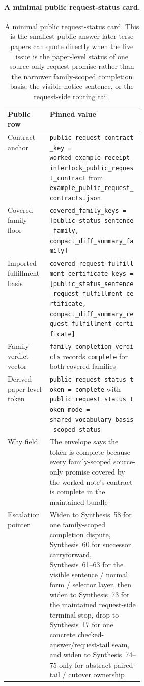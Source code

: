 \documentclass[11pt]{article}
\begin{document}
\paragraph{A minimal public request-status card.}
\begin{table}[t]
\centering
\small
\begin{tabularx}{0.97\linewidth}{@{}p{0.31\linewidth}X@{}}
\toprule
\textbf{Public row} & \textbf{Pinned value}\\
\midrule
Contract anchor & \texttt{public\_request\_contract\_key = worked\_example\_receipt\_interlock\_public\_request\_contract} from \nolinkurl{example_public_request_contracts.json} \\
Covered family floor & \texttt{covered\_family\_keys = [public\_status\_sentence\_family, compact\_diff\_summary\_family]} \\
Imported fulfillment basis & \texttt{covered\_request\_fulfillment\_certificate\_keys = [public\_status\_sentence\_request\_fulfillment\_certificate, compact\_diff\_summary\_request\_fulfillment\_certificate]} \\
Family verdict vector & \texttt{family\_completion\_verdicts} records \texttt{complete} for both covered families \\
Derived paper-level token & \texttt{public\_request\_status\_token = complete} with \texttt{public\_request\_status\_token\_mode = shared\_vocabulary\_basis\_scoped\_status} \\
Why field & The envelope says the token is complete because every family-scoped source-only promise covered by the worked note's contract is complete in the maintained bundle \\
Escalation pointer & Widen to Synthesis~58 for one family-scoped completion dispute, Synthesis~60 for successor carryforward, Synthesis~61--63 for the visible sentence / normal form / selector layer, then widen to Synthesis~73 for the maintained request-side terminal stop, drop to Synthesis~17 for one concrete checked-answer/request-tail seam, and widen to Synthesis~74--75 only for abstract paired-tail / cutover ownership \\
\bottomrule
\end{tabularx}
\caption{A minimal public request-status card. This is the smallest public answer later terse papers can quote directly when the live issue is the paper-level status of one source-only request promise rather than the narrower family-scoped completion basis, the visible notice sentence, or the request-side routing tail.}
\label{tab:minimal-public-request-status-card}
\end{table}
\end{document}
